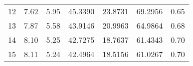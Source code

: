 \begin{table}[H]
\begin{center}
\begin{tabular}{lrrrrrr}
			12          & 7.62              & 5.95                      & 45.3390                   & 23.8731                   & 69.2956                 & 0.65   \\
			13          & 7.87              & 5.58                      & 43.9146                   & 20.9963                   & 64.9864                 & 0.68   \\
			14          & 8.10              & 5.25                      & 42.7275                   & 18.7637                   & 61.4343                 & 0.70   \\
			15          & 8.11              & 5.24                      & 42.4964                   & 18.5156                   & 61.0267                 & 0.70   \\
      \bottomrule
		\end{tabular}
	\end{center}
\end{table}
